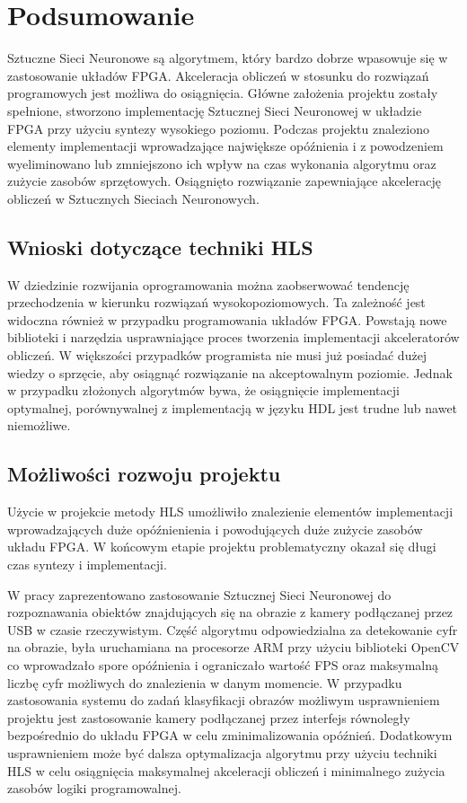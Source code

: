 \newpage %
\cleardoublepage %
\pagestyle{headings}

\section{Podsumowanie}

Sztuczne Sieci Neuronowe są algorytmem, który bardzo dobrze wpasowuje się w zastosowanie układów FPGA. Akceleracja obliczeń w stosunku do rozwiązań programowych jest możliwa do osiągnięcia. Główne założenia projektu zostały spełnione, stworzono implementację Sztucznej Sieci Neuronowej w układzie FPGA przy użyciu syntezy wysokiego poziomu. Podczas projektu znaleziono elementy implementacji wprowadzające największe opóźnienia i z powodzeniem wyeliminowano lub zmniejszono ich wpływ na czas wykonania algorytmu oraz zużycie zasobów sprzętowych. Osiągnięto rozwiązanie zapewniające akcelerację obliczeń w Sztucznych Sieciach Neuronowych.

\subsection{Wnioski dotyczące techniki HLS}
W dziedzinie rozwijania oprogramowania można zaobserwować tendencję przechodzenia w kierunku rozwiązań wysokopoziomowych.
Ta zależność jest widoczna również w przypadku programowania układów FPGA. Powstają nowe biblioteki i narzędzia usprawniające proces tworzenia implementacji akceleratorów obliczeń. W większości przypadków programista nie musi już posiadać dużej wiedzy o sprzęcie, aby osiągnąć rozwiązanie na akceptowalnym poziomie. Jednak w przypadku złożonych algorytmów bywa, że osiągnięcie implementacji optymalnej, porównywalnej z implementacją w języku HDL jest trudne lub nawet niemożliwe.

\subsection{Możliwości rozwoju projektu}

Użycie w projekcie metody HLS umożliwiło znalezienie elementów implementacji wprowadzających duże opóźnienienia i powodujących duże zużycie zasobów układu FPGA. W końcowym etapie projektu problematyczny okazał się długi czas syntezy i implementacji. 

W pracy zaprezentowano zastosowanie Sztucznej Sieci Neuronowej do rozpoznawania obiektów 
znajdujących się na obrazie z kamery podłączanej przez USB w czasie rzeczywistym. Część algorytmu 
odpowiedzialna za detekowanie cyfr na obrazie, była uruchamiana na procesorze ARM przy użyciu 
biblioteki OpenCV co wprowadzało spore opóźnienia i ograniczało wartość FPS oraz maksymalną liczbę 
cyfr możliwych do znalezienia w danym momencie. W przypadku zastosowania systemu do zadań 
klasyfikacji obrazów możliwym usprawnieniem projektu jest zastosowanie kamery podłączanej przez 
interfejs równoległy bezpośrednio do układu FPGA w celu zminimalizowania opóźnień. Dodatkowym 
usprawnieniem może być dalsza optymalizacja algorytmu przy użyciu techniki HLS w celu osiągnięcia maksymalnej akceleracji obliczeń i minimalnego zużycia zasobów logiki programowalnej.

